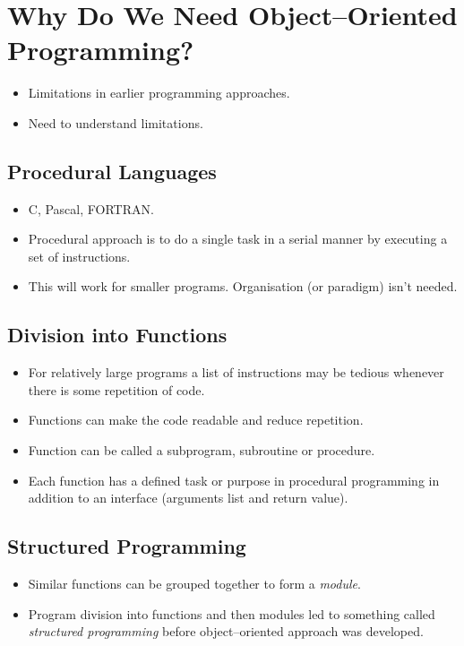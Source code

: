 \documentclass[12pt,a4paper]{article}
\begin{document}
\section{Why Do We Need Object--Oriented Programming?\cite{Lafore}}
\begin{itemize}
\item Limitations in earlier programming approaches.
\item Need to understand limitations.
\end{itemize}
\subsection{Procedural Languages}
\begin{itemize}
\item C, Pascal, FORTRAN.
\item Procedural approach is to do a single task in a serial manner by executing a set of instructions.
\item This will work for smaller programs. Organisation (or paradigm) isn't needed.
\end{itemize}
\subsection{Division into Functions}
\begin{itemize}
\item For relatively large programs a list of instructions may be tedious whenever there is some repetition of code.
\item Functions can make the code readable and reduce repetition.
\item Function can be called a subprogram, subroutine or procedure.
\item Each function has a defined task or purpose in procedural programming in addition to an interface (arguments list and return value).
\end{itemize}
\subsection{Structured Programming}
\begin{itemize}
\item Similar functions can be grouped together to form a \textit{module}.
\item Program division into functions and then modules led to something called \textit{structured programming} before object--oriented approach was developed.
\end{itemize}
\end{document}
